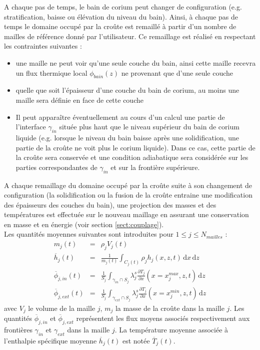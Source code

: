 A chaque pas de temps, le bain de corium peut changer de configuration (e.g. stratification, baisse ou élévation du niveau du bain). Ainsi, à chaque pas de temps le domaine occupé par la croûte est remaillé à partir d'un nombre de mailles de référence donné par l'utilisateur. Ce remaillage est réalisé en respectant les contraintes suivantes :
\begin{itemize}
    \item une maille ne peut voir qu'une seule couche du bain, ainsi cette maille recevra un flux thermique local $\phi_{bain}(z)$ ne provenant que d'une seule couche
    \item quelle que soit l'épaisseur d'une couche du bain de corium, au moins une maille sera définie en face de cette couche
    \item  Il peut apparaître éventuellement au cours d'un calcul une partie de l'interface $\gamma_{in}$ située plus haut que le niveau supérieur du bain de corium liquide (e.g. lorsque le niveau du bain baisse après une solidification, une partie de la croûte ne voit plus le corium liquide). Dans ce cas, cette partie de la croûte sera conservée et une condition adiabatique sera considérée sur les parties correspondantes de $\gamma_{in}$ et sur la frontière supérieure.\\
\end{itemize}

A chaque remaillage du domaine occupé par la croûte suite à son changement de configuration (la solidification ou la fusion de la croûte entraine une modification des épaisseurs des couches du bain), une projection des masses et des températures est effectuée sur le nouveau maillage en assurant une conservation en masse et en énergie (voir section \ref{sect:couplage}).\\

Les quantités moyennes suivantes sont introduites pour $1 \leq j\leq N_{mailles}$ :
\begin{eqnarray}
m_{j}(t) &=& \rho_j  V_j(t) \\
\overline{h}_j(t) &=& \frac{1}{m_j(t)} \int_{C_j(t)} \rho_j h_j(x,z,t)\,\mathrm{d}x\, \mathrm{d}z\\
\overline{\phi}_{j,in}(t) &=& \frac{1}{S_j}\int_{\gamma_{in}\cap S_j}\lambda_j^s \frac{\partial T_{j}}{\partial x}(x=x_j^{max},z,t)\, \mathrm{d}z  \label{eq:phi_j_in}\\
\overline{\phi}_{j,ext}(t) &=& \frac{1}{S_j}\int_{\gamma_{ext}\cap S_j}\lambda_j^s \frac{\partial T_{j}}{\partial x} (x=x_j^{min},z,t)\, \mathrm{d}z  \label{eq:phi_j_ext}
\end{eqnarray}
avec $V_j$ le volume de la maille $j$, $m_{j}$ la masse de la croûte dans la maille $j$. Les quantités $\overline{\phi}_{j,in}$ et $\overline{\phi}_{j,ext}$ représentent les flux moyens associés respectivement aux frontières $\gamma_{in}$ et $\gamma_{ext}$ dans la maille $j$. La température moyenne associée à l'enthalpie spécifique moyenne $\overline{h}_j(t)$ est notée $\overline{T}_{j}(t)$.


